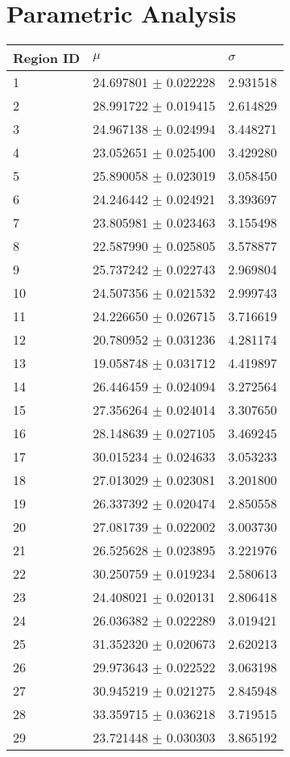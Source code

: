 \documentclass[12pt]{article}
\begin{document}
\section{Parametric Analysis}
\begin{table}
\begin{tabular}{|l|l|l|}
\hline
Region ID & $\mu$ & $\sigma$\\\hline
1 & 24.697801 $\pm$ 0.022228 & 2.931518\\\hline
2 & 28.991722 $\pm$ 0.019415 & 2.614829\\\hline
3 & 24.967138 $\pm$ 0.024994 & 3.448271\\\hline
4 & 23.052651 $\pm$ 0.025400 & 3.429280\\\hline
5 & 25.890058 $\pm$ 0.023019 & 3.058450\\\hline
6 & 24.246442 $\pm$ 0.024921 & 3.393697\\\hline
7 & 23.805981 $\pm$ 0.023463 & 3.155498\\\hline
8 & 22.587990 $\pm$ 0.025805 & 3.578877\\\hline
9 & 25.737242 $\pm$ 0.022743 & 2.969804\\\hline
10 & 24.507356 $\pm$ 0.021532 & 2.999743\\\hline
11 & 24.226650 $\pm$ 0.026715 & 3.716619\\\hline
12 & 20.780952 $\pm$ 0.031236 & 4.281174\\\hline
13 & 19.058748 $\pm$ 0.031712 & 4.419897\\\hline
14 & 26.446459 $\pm$ 0.024094 & 3.272564\\\hline
15 & 27.356264 $\pm$ 0.024014 & 3.307650\\\hline
16 & 28.148639 $\pm$ 0.027105 & 3.469245\\\hline
17 & 30.015234 $\pm$ 0.024633 & 3.053233\\\hline
18 & 27.013029 $\pm$ 0.023081 & 3.201800\\\hline
19 & 26.337392 $\pm$ 0.020474 & 2.850558\\\hline
20 & 27.081739 $\pm$ 0.022002 & 3.003730\\\hline
21 & 26.525628 $\pm$ 0.023895 & 3.221976\\\hline
22 & 30.250759 $\pm$ 0.019234 & 2.580613\\\hline
23 & 24.408021 $\pm$ 0.020131 & 2.806418\\\hline
24 & 26.036382 $\pm$ 0.022289 & 3.019421\\\hline
25 & 31.352320 $\pm$ 0.020673 & 2.620213\\\hline
26 & 29.973643 $\pm$ 0.022522 & 3.063198\\\hline
27 & 30.945219 $\pm$ 0.021275 & 2.845948\\\hline
28 & 33.359715 $\pm$ 0.036218 & 3.719515\\\hline
29 & 23.721448 $\pm$ 0.030303 & 3.865192\\\hline
\end{tabular}
\end{table}
\end{document}

